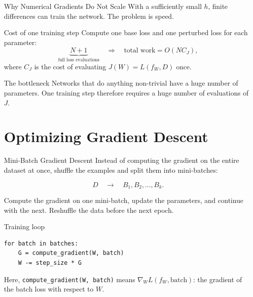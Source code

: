 \documentclass[aspectratio=169]{beamer}
\begin{document}
\begin{frame}{Why Numerical Gradients Do Not Scale}
  With a sufficiently small $h$, finite differences can train the network.
  The problem is speed.

  \begin{block}{Cost of one training step}
    Compute one base loss and one perturbed loss for each parameter:
    \begin{equation*}
      \underbrace{N+1}_{\text{full loss evaluations}}
      \quad\Longrightarrow\quad
      \text{total work}=O(NC_J),
    \end{equation*}
    where $C_J$ is the cost of evaluating $J(W)=L(f_W,D)$ once.
  \end{block}

  \begin{alertblock}{The bottleneck}
    Networks that do anything non-trivial have a huge number of parameters.
    One training step therefore requires a huge number of evaluations of $J$.
  \end{alertblock}
\end{frame}

\section{Optimizing Gradient Descent}

\begin{frame}[fragile]{Mini-Batch Gradient Descent}
  Instead of computing the gradient on the entire dataset at once, shuffle
  the examples and split them into mini-batches:

  \begin{equation*}
    D \quad\longrightarrow\quad B_1, B_2, \ldots, B_k.
  \end{equation*}

  Compute the gradient on one mini-batch, update the parameters, and continue
  with the next. Reshuffle the data before the next epoch.

  \begin{block}{Training loop}
\begin{verbatim}
for batch in batches:
    G = compute_gradient(W, batch)
    W -= step_size * G
\end{verbatim}
  \end{block}

  Here, \texttt{compute\_gradient(W, batch)} means
  $\nabla_W L(f_W, \text{batch})$: the gradient of the batch loss with
  respect to $W$.
\end{frame}
\end{document}
